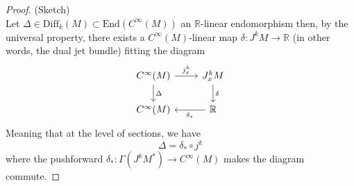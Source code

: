 \begin{proof}{(Sketch)\\}
    Let $\Delta \in \mathrm{Diff}_k(M) \subset \mathrm{End}(C^\infty(M))$ an $\mathbb{R}$-linear endomorphism then, by the universal property, there exists a $C^\infty(M)$-linear map $\delta : J^k M \rightarrow \mathbb{R}$ (in other words, the dual jet bundle) fitting the diagram
    \begin{equation}
        \begin{tikzcd}
            C^\infty(M) \arrow["j^k_x"]{r} \arrow["\Delta"]{d}& J^k_x M \arrow["\delta"]{d} \\
            C^\infty(M) & \mathbb{R} \arrow["\delta_*"]{l}
        \end{tikzcd}
    \end{equation}
    Meaning that at the level of sections, we have 
    \begin{equation}
        \Delta = \delta_* \circ j^k
    \end{equation}
    where the pushforward $\delta_*: \Gamma(J^k M ^*) \rightarrow C^\infty(M)$ makes the diagram commute.
\end{proof}
